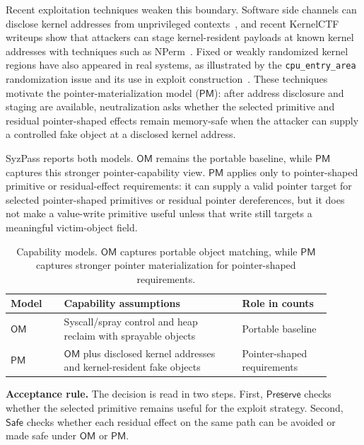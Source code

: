 Recent exploitation techniques weaken this boundary. Software side channels can disclose kernel addresses from unprivileged contexts~\cite{kernelsnitch}, and recent KernelCTF writeups show that attackers can stage kernel-resident payloads at known kernel addresses with techniques such as NPerm~\cite{kernelctf-nperm}. Fixed or weakly randomized kernel regions have also appeared in real systems, as illustrated by the \texttt{cpu\_entry\_area} randomization issue and its use in exploit construction~\cite{cve20230597,kernelctf-cpuentry}. These techniques motivate the pointer-materialization model ($\mathsf{PM}$): after address disclosure and staging are available, neutralization asks whether the selected primitive and residual pointer-shaped effects remain memory-safe when the attacker can supply a controlled fake object at a disclosed kernel address.

SyzPass reports both models. $\mathsf{OM}$ remains the portable baseline, while $\mathsf{PM}$ captures this stronger pointer-capability view. $\mathsf{PM}$ applies only to pointer-shaped primitive or residual-effect requirements: it can supply a valid pointer target for selected pointer-shaped primitives or residual pointer dereferences, but it does not make a value-write primitive useful unless that write still targets a meaningful victim-object field.

\begin{table}[!h]
  \centering
  \small
  \setlength{\tabcolsep}{3pt}
  \renewcommand{\arraystretch}{1.08}
  \begin{tabular}{@{}p{0.15\linewidth}p{0.50\linewidth}p{0.25\linewidth}@{}}
    \toprule
    \textbf{Model} & \textbf{Capability assumptions} & \textbf{Role in counts} \\
    \midrule
    $\mathsf{OM}$ & Syscall/spray control and heap reclaim with sprayable objects & Portable baseline \\
    $\mathsf{PM}$ & $\mathsf{OM}$ plus disclosed kernel addresses and kernel-resident fake objects & Pointer-shaped requirements \\
    \bottomrule
  \end{tabular}
  \caption{Capability models. $\mathsf{OM}$ captures portable object matching, while $\mathsf{PM}$ captures stronger pointer materialization for pointer-shaped requirements.}
  \label{tab:capability-models}
\end{table}

\noindent\textbf{Acceptance rule.}
The decision is read in two steps. First, $\mathsf{Preserve}$ checks whether the selected primitive remains useful for the exploit strategy. Second, $\mathsf{Safe}$ checks whether each residual effect on the same path can be avoided or made safe under $\mathsf{OM}$ or $\mathsf{PM}$.

